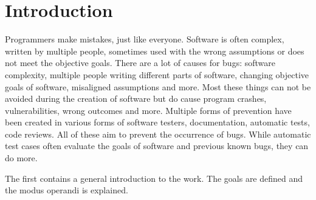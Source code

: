 \chapter{Introduction}
\label{cha:intro}
Programmers make mistakes, just like everyone.
Software is often complex, written by multiple people, sometimes used with the wrong assumptions or does not meet the objective goals. 
There are a lot of causes for bugs: software complexity, multiple people writing different parts of software, changing objective goals of software, misaligned assumptions and more. Most these things can not be avoided during the creation of software but do cause program crashes, vulnerabilities, wrong outcomes and more.
Multiple forms of prevention have been created in various forms of software testers, documentation, automatic tests, code reviews. All of these aim to prevent the occurrence of bugs. While automatic test cases often evaluate the goals of software and previous known bugs, they can do more.



The first contains a general introduction to the work. The goals are defined and the modus operandi is explained.

